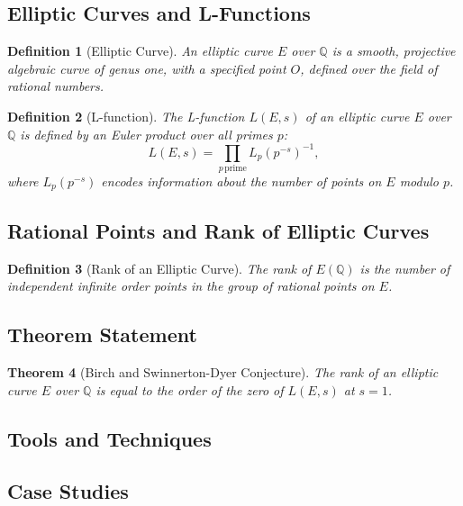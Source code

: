 \documentclass[12pt, a4paper]{article}
\newtheorem{theorem}{Theorem}[section]
\theoremstyle{definitionstyle}
\newtheorem{definition}[theorem]{Definition}
\begin{document}
\subsection{Elliptic Curves and L-Functions}
\begin{definition}[Elliptic Curve]
An elliptic curve $E$ over $\mathbb{Q}$ is a smooth, projective algebraic curve of genus one, with a specified point $O$, defined over the field of rational numbers.
\end{definition}

\begin{definition}[L-function]
The L-function $L(E,s)$ of an elliptic curve $E$ over $\mathbb{Q}$ is defined by an Euler product over all primes $p$:
\begin{equation}
L(E,s) = \prod_{p\,\text{prime}} L_p(p^{-s})^{-1},
\end{equation}
where $L_p(p^{-s})$ encodes information about the number of points on $E$ modulo $p$.
\end{definition}

\subsection{Rational Points and Rank of Elliptic Curves}
\begin{definition}[Rank of an Elliptic Curve]
The rank of $E(\mathbb{Q})$ is the number of independent infinite order points in the group of rational points on $E$.
\end{definition}

\subsection{Theorem Statement}
\begin{theorem}[Birch and Swinnerton-Dyer Conjecture]
\label{thm:bsd}
The rank of an elliptic curve $E$ over $\mathbb{Q}$ is equal to the order of the zero of $L(E,s)$ at $s=1$.
\end{theorem}

\subsection{Tools and Techniques}

\subsection{Case Studies}
\end{document}
